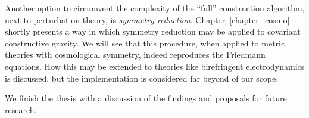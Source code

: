 Another option to circumvent the complexity of the ``full'' construction algorithm, next to perturbation theory, is \emph{symmetry reduction}. Chapter~\ref{chapter_cosmo} shortly presents a way in which symmetry reduction may be applied to covariant constructive gravity. We will see that this procedure, when applied to metric theories with cosmological symmetry, indeed reproduces the Friedmann equations. How this may be extended to theories like birefringent electrodynamics is discussed, but the implementation is considered far beyond of our scope.

We finish the thesis with a discussion of the findings and proposals for future research.

